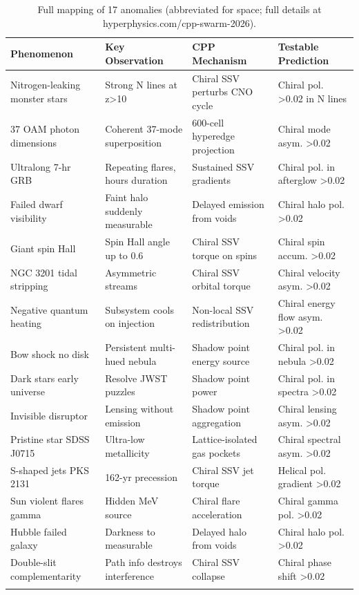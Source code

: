 \documentclass[11pt]{article}
\begin{document}
\begin{longtable}{p{3cm} p{3.5cm} p{3.5cm} p{4cm}}
\toprule
\textbf{Phenomenon} & \textbf{Key Observation} & \textbf{CPP Mechanism} & \textbf{Testable Prediction} \\
\midrule
Nitrogen-leaking monster stars & Strong N lines at z>10 & Chiral SSV perturbs CNO cycle & Chiral pol. >0.02 in N lines \\
37 OAM photon dimensions & Coherent 37-mode superposition & 600-cell hyperedge projection & Chiral mode asym. >0.02 \\
Ultralong 7-hr GRB & Repeating flares, hours duration & Sustained SSV gradients & Chiral pol. in afterglow >0.02 \\
Failed dwarf visibility & Faint halo suddenly measurable & Delayed emission from voids & Chiral halo pol. >0.02 \\
Giant spin Hall & Spin Hall angle up to 0.6 & Chiral SSV torque on spins & Chiral spin accum. >0.02 \\
NGC 3201 tidal stripping & Asymmetric streams & Chiral SSV orbital torque & Chiral velocity asym. >0.02 \\
Negative quantum heating & Subsystem cools on injection & Non-local SSV redistribution & Chiral energy flow asym. >0.02 \\
Bow shock no disk & Persistent multi-hued nebula & Shadow point energy source & Chiral pol. in nebula >0.02 \\
Dark stars early universe & Resolve JWST puzzles & Shadow point power & Chiral pol. in spectra >0.02 \\
Invisible disruptor & Lensing without emission & Shadow point aggregation & Chiral lensing asym. >0.02 \\
Pristine star SDSS J0715 & Ultra-low metallicity & Lattice-isolated gas pockets & Chiral spectral asym. >0.02 \\
S-shaped jets PKS 2131 & 162-yr precession & Chiral SSV jet torque & Helical pol. gradient >0.02 \\
Sun violent flares gamma & Hidden MeV source & Chiral flare acceleration & Chiral gamma pol. >0.02 \\
Hubble failed galaxy & Darkness to measurable & Delayed halo from voids & Chiral halo pol. >0.02 \\
Double-slit complementarity & Path info destroys interference & Chiral SSV collapse & Chiral phase shift >0.02 \\
\bottomrule
\caption{Full mapping of 17 anomalies (abbreviated for space; full details at hyperphysics.com/cpp-swarm-2026).}
\end{longtable}
\end{document}
